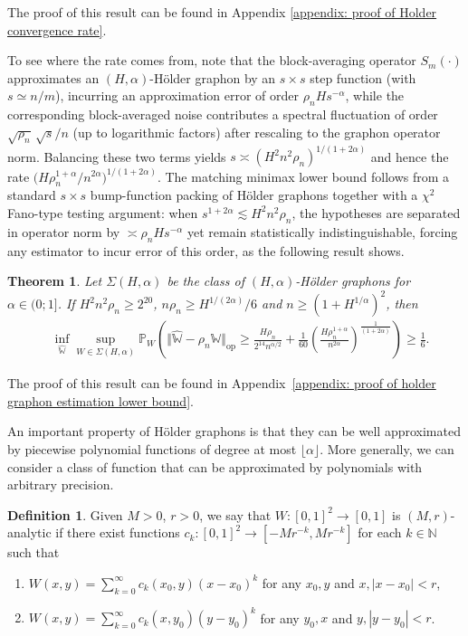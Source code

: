 \documentclass[11pt]{article}
\newcommand{\op}{\mathrm{op}}
\newcommand{\bbW}{\mathbb{W}}
\newcommand{\bbP}{\mathbb{P}}
\newcommand{\bbN}{\mathbb{N}}
\newcommand{\<}{\langle}
\renewcommand{\>}{\rangle}
\theoremstyle{plain}
\newtheorem{theorem}{Theorem}
\theoremstyle{definition}
\newtheorem{definition}{Definition}
\theoremstyle{remark}
\begin{document}
The proof of this result can be found in Appendix \ref{appendix: proof of Holder convergence rate}.  

{
To see where the rate comes from, note that the block-averaging operator $S_m(\cdot)$ approximates an $(H,\alpha)$-H\"older graphon by an $s\times s$ step function (with $s\simeq n/m$), incurring an approximation error of order $\rho_n H s^{-\alpha}$, while the corresponding block-averaged noise contributes a spectral fluctuation of order $\sqrt{\rho_n}\,\sqrt{s}/n$ (up to logarithmic factors) after rescaling to the graphon operator norm.
Balancing these two terms yields $s\asymp (H^2 n^2\rho_n)^{1/(1+2\alpha)}$ and hence the rate $\big(H\rho_n^{1+\alpha}/n^{2\alpha}\big)^{1/(1+2\alpha)}$.
The matching minimax lower bound follows from a standard $s\times s$ bump-function packing of H\"older graphons together with a $\chi^2$ Fano-type testing argument: when $s^{1+2\alpha}\lesssim H^2 n^2\rho_n$, the hypotheses are separated in operator norm by $\asymp \rho_n H s^{-\alpha}$ yet remain statistically indistinguishable, forcing any estimator to incur error of this order, as the following result shows.
\begin{theorem}
\label{theorem: holder graphon estimation lower bound}
    Let $\Sigma(H, \alpha)$ be the class of $(H, \alpha)$-H\"older graphons for $\alpha \in (0; 1]$. If $H^2 n^2 \rho_n \ge 2^{20}$, $n \rho_n \ge H^{1/(2 \alpha)} / 6$ and $n \ge (1 + H^{1/\alpha})^2$, then
    \begin{align*}
        & \inf_{\widehat{\bbW}} \sup_{W \in \Sigma(H, \alpha)} \bbP_{W} \left (   \Vert \widehat{\bbW} - \rho_n \bbW \Vert_{\op} \ge \frac{ H \rho_n}{2^{14} n^{\alpha/2}} + \frac{1}{60} \left ( \frac{H \rho_n^{1 + \alpha}}{n^{2 \alpha}} \right )^{\frac{1}{(1 + 2 \alpha)}} \right ) \ge \frac{1}{6}.
    \end{align*}
\end{theorem}

The proof of this result can be found in Appendix~\ref{appendix: proof of holder graphon estimation lower bound}.
}


An important property of H\"older graphons is that they can be well approximated by piecewise polynomial functions of degree at most $\lfloor \alpha \rfloor $. More generally, we can consider a class of function that can be approximated  by polynomials with arbitrary precision. 

\begin{definition}
\label{condition: M-r analiticity}
    Given $M > 0$, $r > 0$,  we say that $W : [0,1]^2 \rightarrow [0,1]$ is $(M,r)$-analytic if there exist functions $c_k : [0, 1]^2 \to [-Mr^{-k}, Mr^{-k}]$ for each $k \in \bbN$ such that
    \begin{enumerate}
        \item $	W(x, y) = \sum_{k = 0}^{\infty} c_k(x_0, y) (x - x_0)^k $ for any $x_0, y$ and $x, |x - x_0| < r$, 
        \item $	W(x, y) = \sum_{k = 0}^{\infty} c_k(x, y_0) (y - y_0)^k $ for any $y_0, x$ and $y, |y - y_0| < r$.
    \end{enumerate}

	
\end{definition}
\end{document}
